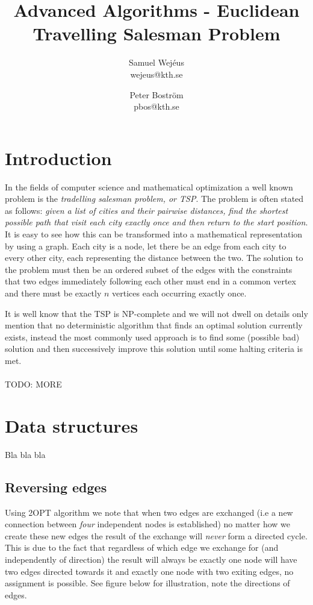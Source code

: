\documentclass[a4paper,12pt,oneside]{article}
\title{Advanced Algorithms - Euclidean Travelling Salesman Problem}
\author{Samuel Wej\'eus \\ \lowercase{wejeus@kth.se} \and Peter Boström \\ \lowercase{pbos@kth.se} }
\begin{document}
\maketitle

\section{Introduction}
In the fields of computer science and mathematical optimization a well known problem is the \textit{tradelling salesman problem, or TSP}. The problem is often stated as follows: \textit{given a list of cities and their pairwise distances, find the shortest possible path that visit each city exactly once and then return to the start position}. It is easy to see how this can be transformed into a mathematical representation by using a graph. Each city is a node, let there be an edge from each city to every other city, each representing the distance between the two. The solution to the problem must then be an ordered subset of the edges with the constraints that two edges immediately following each other must end in a common vertex and there must be exactly $n$ vertices each occurring exactly once.

It is well know that the TSP is NP-complete and we will not dwell on details only mention that no deterministic algorithm that finds an optimal solution currently exists, instead the most commonly used approach is to find some (possible bad) solution and then successively improve this solution until some halting criteria is met.
\\\\
TODO: MORE

\section{Data structures}
Bla bla bla 

\subsection{Reversing edges}
Using 2OPT algorithm we note that when two edges are exchanged (i.e a new connection between \textit{four} independent nodes is established) no matter how we create these new edges the result of the exchange will \textit{never} form a directed cycle. This is due to the fact that regardless of which edge we exchange for (and independently of direction) the result will always be exactly one node will have two edges directed towards it and exactly one node with two exiting edges, no assignment is possible. See figure below for illustration, note the directions of edges.
\end{document}
